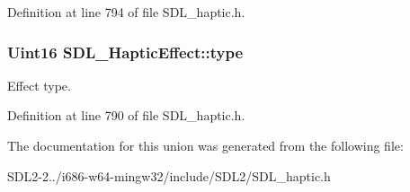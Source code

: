 Definition at line 794 of file S\+D\+L\+\_\+haptic.\+h.

\hypertarget{unionSDL__HapticEffect_a5ff6cfd8da91537091e9a6c2108cb179}{
\subsubsection[{type}]{\setlength{\rightskip}{0pt plus 5cm}Uint16 S\+D\+L\+\_\+\+Haptic\+Effect\+::type}}\label{unionSDL__HapticEffect_a5ff6cfd8da91537091e9a6c2108cb179}
Effect type. 

Definition at line 790 of file S\+D\+L\+\_\+haptic.\+h.



The documentation for this union was generated from the following file\+:\begin{DoxyCompactItemize}
\item 
S\+D\+L2-\/2../i686-\/w64-\/mingw32/include/\+S\+D\+L2/S\+D\+L\+\_\+haptic.\+h\end{DoxyCompactItemize}
